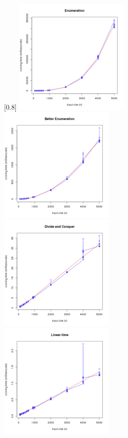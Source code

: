 \documentclass[11pt]{scrreprt}
\begin{document}
\begin{figure}
	\captionsetup{singlelinecheck=off}
	\captionsetup[subfigure]{singlelinecheck=on}
	[0.8\textwidth]{%
		\includegraphics[width=0.50\textwidth]{enumeration.png}%
		\includegraphics[width=0.50\textwidth]{better_enumeration.png}\\
		\includegraphics[width=0.50\textwidth]{divide_n_conquer.png}%
		\includegraphics[width=0.50\textwidth]{linear_time.png}%
	}%
\end{figure}
\end{document}
